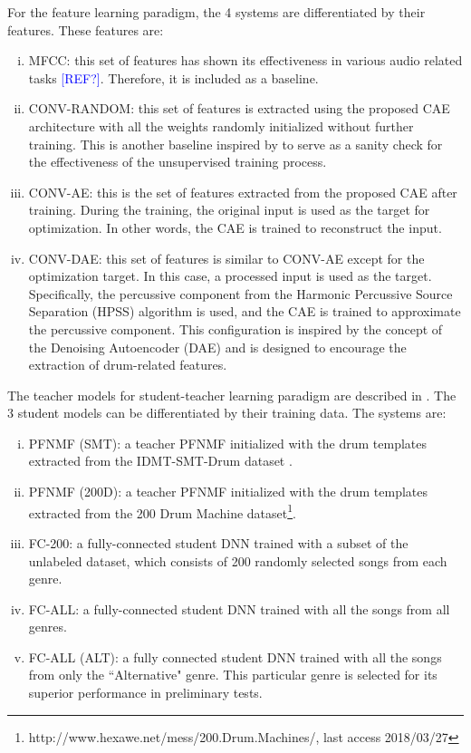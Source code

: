 \documentclass{article}
\newcommand{\comment}[1]{{\textcolor{blue}{#1}}}
\begin{document}
For the feature learning paradigm, the 4 systems are differentiated by their features. These features are: 
\begin{enumerate}[(i)]
\item MFCC: this set of features has shown its effectiveness in various audio related tasks \comment{[REF?]}. Therefore, it is included as a baseline.   
\item CONV-RANDOM: this set of features is extracted using the proposed CAE architecture with all the weights randomly initialized without further training. This is another baseline inspired by \cite{Choi2017a} to serve as a sanity check for the effectiveness of the unsupervised training process.  
\item CONV-AE: this is the set of features extracted from the proposed CAE after training. During the training, the original input is used as the target for optimization. In other words, the CAE is trained to reconstruct the input. 
\item CONV-DAE: this set of features is similar to CONV-AE except for the optimization target. In this case, a processed input is used as the target. Specifically, the percussive component from the Harmonic Percussive Source Separation (HPSS) \cite{Fitzgerald2010} algorithm is used, and the CAE is trained to approximate the percussive component. This configuration is inspired by the concept of the Denoising Autoencoder (DAE) \cite{Vincent2008} and is designed to encourage the extraction of drum-related features. 
\end{enumerate}

The teacher models for student-teacher learning paradigm are described in \cite{Wu2017}. The 3 student models can be differentiated by their training data. The systems are: 
\begin{enumerate}[(i)]
\item PFNMF (SMT): a teacher PFNMF initialized with the drum templates extracted from the IDMT-SMT-Drum dataset \cite{DittmarG14_DrumTranscription_DAFX}.
\item PFNMF (200D): a teacher PFNMF initialized with the drum templates extracted from the 200 Drum Machine dataset\footnote{http://www.hexawe.net/mess/200.Drum.Machines/, last access 2018/03/27}.
\item FC-200: a fully-connected student DNN trained with a subset of the unlabeled dataset, which consists of 200 randomly selected songs from each genre. 
\item FC-ALL: a fully-connected student DNN trained with all the songs from all genres.
\item FC-ALL (ALT): a fully connected student DNN trained with all the songs from only the ``Alternative" genre. This particular genre is selected for its superior performance in preliminary tests. 
\end{enumerate}
\end{document}
